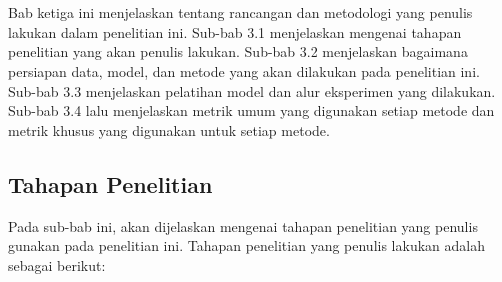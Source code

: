 \chapter{\babTiga}
Bab ketiga ini menjelaskan tentang rancangan dan metodologi yang penulis lakukan dalam penelitian ini. Sub-bab 3.1 menjelaskan mengenai tahapan penelitian yang akan penulis lakukan. Sub-bab 3.2 menjelaskan bagaimana persiapan data, model, dan metode yang akan dilakukan pada penelitian ini. Sub-bab 3.3 menjelaskan pelatihan model dan alur eksperimen yang dilakukan. Sub-bab 3.4 lalu menjelaskan metrik umum yang digunakan setiap metode dan metrik khusus yang digunakan untuk setiap metode.

\section{Tahapan Penelitian}
Pada sub-bab ini, akan dijelaskan mengenai tahapan penelitian yang penulis gunakan pada penelitian ini. Tahapan penelitian yang penulis lakukan adalah sebagai berikut:

